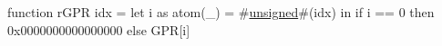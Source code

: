 function rGPR idx = {
         let i as atom(_) = #\hyperref[sailMIPSzunsigned]{unsigned}#(idx) in
         if i == 0 then 0x0000000000000000 else GPR[i]
}
